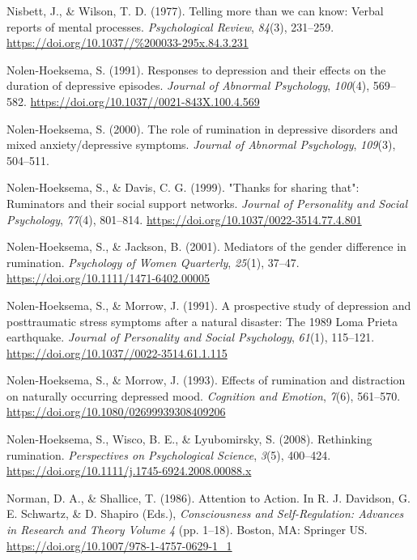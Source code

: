\documentclass[a4paper,12pt,twoside,onecolumn,openright,final,oldfontcommands]{memoir}
\begin{document}
\leavevmode\hypertarget{ref-nisbett_telling_1977}{}%
Nisbett, J., \& Wilson, T. D. (1977). Telling more than we can know: Verbal reports of mental processes. \emph{Psychological Review}, \emph{84}(3), 231--259. \url{https://doi.org/10.1037//\%200033-295x.84.3.231}

\leavevmode\hypertarget{ref-nolen-hoeksema_responses_1991}{}%
Nolen-Hoeksema, S. (1991). Responses to depression and their effects on the duration of depressive episodes. \emph{Journal of Abnormal Psychology}, \emph{100}(4), 569--582. \url{https://doi.org/10.1037//0021-843X.100.4.569}

\leavevmode\hypertarget{ref-Nolen-Hoeksema2000}{}%
Nolen-Hoeksema, S. (2000). The role of rumination in depressive disorders and mixed anxiety/depressive symptoms. \emph{Journal of Abnormal Psychology}, \emph{109}(3), 504--511.

\leavevmode\hypertarget{ref-nolen-hoeksema_thanks_1999}{}%
Nolen-Hoeksema, S., \& Davis, C. G. (1999). "Thanks for sharing that": Ruminators and their social support networks. \emph{Journal of Personality and Social Psychology}, \emph{77}(4), 801--814. \url{https://doi.org/10.1037/0022-3514.77.4.801}

\leavevmode\hypertarget{ref-nolen-hoeksema_mediators_2001}{}%
Nolen-Hoeksema, S., \& Jackson, B. (2001). Mediators of the gender difference in rumination. \emph{Psychology of Women Quarterly}, \emph{25}(1), 37--47. \url{https://doi.org/10.1111/1471-6402.00005}

\leavevmode\hypertarget{ref-nolen-hoeksema_prospective_1991}{}%
Nolen-Hoeksema, S., \& Morrow, J. (1991). A prospective study of depression and posttraumatic stress symptoms after a natural disaster: The 1989 Loma Prieta earthquake. \emph{Journal of Personality and Social Psychology}, \emph{61}(1), 115--121. \url{https://doi.org/10.1037//0022-3514.61.1.115}

\leavevmode\hypertarget{ref-nolen-hoeksema_effects_1993}{}%
Nolen-Hoeksema, S., \& Morrow, J. (1993). Effects of rumination and distraction on naturally occurring depressed mood. \emph{Cognition and Emotion}, \emph{7}(6), 561--570. \url{https://doi.org/10.1080/02699939308409206}

\leavevmode\hypertarget{ref-Nolen-Hoeksema2008}{}%
Nolen-Hoeksema, S., Wisco, B. E., \& Lyubomirsky, S. (2008). Rethinking rumination. \emph{Perspectives on Psychological Science}, \emph{3}(5), 400--424. \url{https://doi.org/10.1111/j.1745-6924.2008.00088.x}

\leavevmode\hypertarget{ref-norman_attention_1986}{}%
Norman, D. A., \& Shallice, T. (1986). Attention to Action. In R. J. Davidson, G. E. Schwartz, \& D. Shapiro (Eds.), \emph{Consciousness and Self-Regulation: Advances in Research and Theory Volume 4} (pp. 1--18). Boston, MA: Springer US. \url{https://doi.org/10.1007/978-1-4757-0629-1_1}
\end{document}
